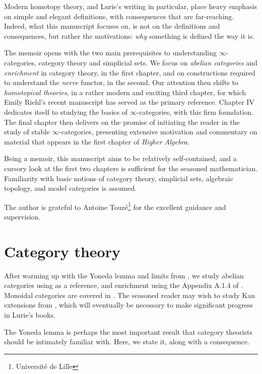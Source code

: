 \documentclass[10pt]{amsart}
\makeatletter
\newcommand{\8}{\ensuremath{\infty}}
\newcommand{\0}{\ensuremath{\overset{\rightarrow}{0}}}
\newcommand{\1}{\ensuremath{\mathbf{1}}}
\theoremstyle{definition}
\def\subsection{\@startsection{subsection}{2}
  \z@{.5\linespacing\@plus.7\linespacing}{.6\baselineskip}{\centering}}
\numberwithin{definition}{subsection}
\numberwithin{definition}{section}
\makeatother
\begin{document}
{  Modern homotopy theory, and Lurie's writing in particular, place heavy emphasis on simple and elegant definitions, with consequences that are far-reaching. Indeed, what this manuscript focuses on, is not on the definitions and consequences, but rather the motivations: \emph{why} something is defined the way it is.

  The memoir opens with the two main prerequisites to understanding \8-categories, category theory and simplicial sets. We focus on \emph{abelian categories} and \emph{enrichment} in category theory, in the first chapter, and on constructions required to understand the \emph{nerve} functor, in the second. Our attention then shifts to \emph{homotopical theories}, in a rather modern and exciting third chapter, for which Emily Riehl's recent manuscript has served as the primary reference. Chapter IV dedicates itself to studying the basics of \8-categories, with this firm foundation. The final chapter then delivers on the promise of initiating the reader in the study of stable \8-categories, presenting extensive motivation and commentary on material that appears in the first chapter of \emph{Higher Algebra}.

  Being a memoir, this manuscript aims to be relatively self-contained, and a cursory look at the first two chapters is sufficient for the seasoned mathematician. Familiarity with basic notions of category theory, simplicial sets, algebraic topology, and model categories is assumed.

  The author is grateful to Antoine Touzé\footnote{Université de Lille} for the excellent guidance and supervision.}

\section{Category theory}
After warming up with the Yoneda lemma and limits from \cite{Riehl17}, we study abelian categories using \cite{Schapira03} as a reference, and enrichment using the Appendix A.1.4 of \cite{Lurie09a}. Monoidal categories are covered in \cite{MacLane13}. The seasoned reader may wish to study Kan extensions from \cite{Riehl17}, which will eventually be necessary to make significant progress in Lurie's books.

\subsection{Yoneda lemma}
The Yoneda lemma is perhaps the most important result that category theorists should be intimately familiar with. Here, we state it, along with a consequence.
\end{document}

